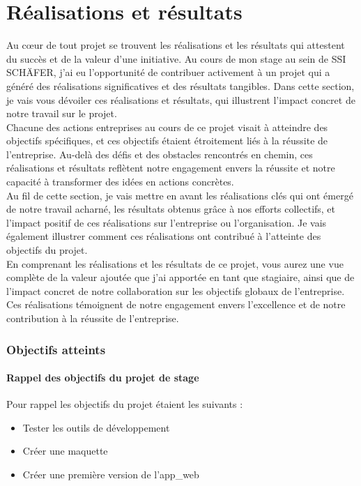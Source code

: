 \documentclass[a4paper, 12pt, french]{article}
\newcommand{\bdot}{\item[\color{ssiYellow}\ding{108}]}
\begin{document}
		\part{Réalisations et résultats}\label{section:results}
			Au cœur de tout projet se trouvent les réalisations et les résultats qui attestent du succès et de la valeur d'une initiative. Au cours de mon stage au sein de SSI SCHÄFER, j'ai eu l'opportunité de contribuer activement à un projet qui a généré des réalisations significatives et des résultats tangibles. Dans cette section, je vais vous dévoiler ces réalisations et résultats, qui illustrent l'impact concret de notre travail sur le projet.\\

			Chacune des actions entreprises au cours de ce projet visait à atteindre des objectifs spécifiques, et ces objectifs étaient étroitement liés à la réussite de l'entreprise. Au-delà des défis et des obstacles rencontrés en chemin, ces réalisations et résultats reflètent notre engagement envers la réussite et notre capacité à transformer des idées en actions concrètes.\\

			Au fil de cette section, je vais mettre en avant les réalisations clés qui ont émergé de notre travail acharné, les résultats obtenus grâce à nos efforts collectifs, et l'impact positif de ces réalisations sur l'entreprise ou l'organisation. Je vais également illustrer comment ces réalisations ont contribué à l'atteinte des objectifs du projet.\\

			En comprenant les réalisations et les résultats de ce projet, vous aurez une vue complète de la valeur ajoutée que j'ai apportée en tant que stagiaire, ainsi que de l'impact concret de notre collaboration sur les objectifs globaux de l'entreprise. Ces réalisations témoignent de notre engagement envers l'excellence et de notre contribution à la réussite de l'entreprise.

			\section{Objectifs atteints}
				\subsection{Rappel des objectifs du projet de stage}
					Pour rappel les objectifs du projet étaient les suivants :
					\begin{itemize}
						\bdot{Tester les outils de développement}
						\bdot{Créer une maquette}
						\bdot{Créer une première version de l'\gls{app_web}}
					\end{itemize}
					
\end{document}
